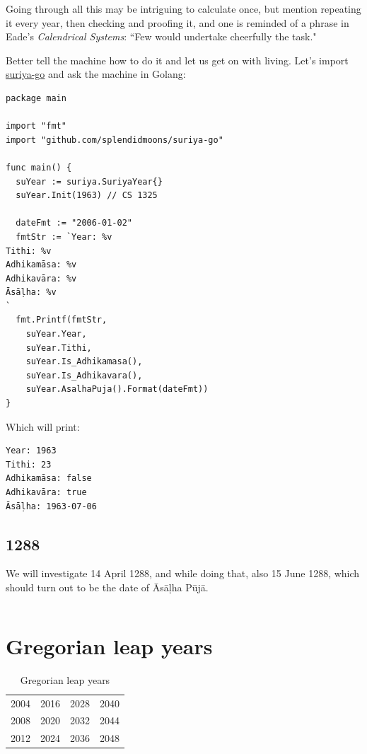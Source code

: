 \documentclass[11pt,oneside]{memoir-article}
\begin{document}
Going through all this may be intriguing to calculate once, but mention
repeating it every year, then checking and proofing it, and one is reminded of a
phrase in Eade's \emph{Calendrical Systems}: ``Few would undertake cheerfully the
task."\autocite{eade1995calendrical}

Better tell the machine how to do it and let us get on with living. Let's
import \href{https://github.com/splendidmoons/suriya-go}{suriya-go} and ask the machine in Golang:

\begin{verbatim}
package main

import "fmt"
import "github.com/splendidmoons/suriya-go"

func main() {
  suYear := suriya.SuriyaYear{}
  suYear.Init(1963) // CS 1325

  dateFmt := "2006-01-02"
  fmtStr := `Year: %v
Tithi: %v
Adhikamāsa: %v
Adhikavāra: %v
Āsāḷha: %v
`
  fmt.Printf(fmtStr,
    suYear.Year,
    suYear.Tithi,
    suYear.Is_Adhikamasa(),
    suYear.Is_Adhikavara(),
    suYear.AsalhaPuja().Format(dateFmt))
}
\end{verbatim}

Which will print:

\begin{verbatim}
Year: 1963
Tithi: 23
Adhikamāsa: false
Adhikavāra: true
Āsāḷha: 1963-07-06
\end{verbatim}

\section{1288}
\label{sec-6-1}
\label{golang-1288}

We will investigate 14 April 1288, and while doing that, also 15 June 1288,
which should turn out to be the date of Āsāḷha Pūjā.

\inputminted{go}{./includes/print-1288.go}

\chapter{Gregorian leap years}
\label{sec-7}

\begin{table}[h]
\caption{\label{tbl-cycle-leap-years} Gregorian leap years}
\centering
\begin{tabular}{rrrr}
2004 & 2016 & 2028 & 2040\\
2008 & 2020 & 2032 & 2044\\
2012 & 2024 & 2036 & 2048\\
\end{tabular}
\end{table}
\end{document}
